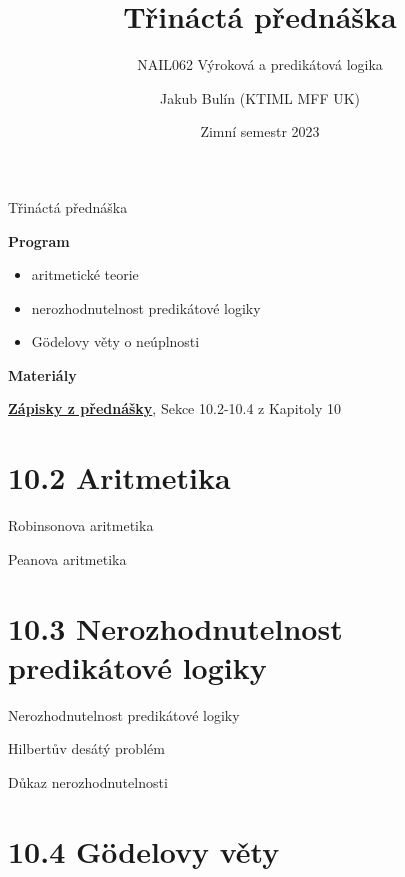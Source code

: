 \documentclass{beamer}
\title{Třináctá přednáška}
\subtitle{NAIL062 Výroková a predikátová logika}
\author{Jakub Bulín (KTIML MFF UK)}
\date{Zimní semestr 2023}
\begin{document}
\frame{\titlepage}


\begin{frame}{Třináctá přednáška}

    \textbf{Program}
        \begin{itemize}
            \item aritmetické teorie
            \item nerozhodnutelnost predikátové logiky
            \item Gödelovy věty o neúplnosti
        \end{itemize}      
    
    \textbf{Materiály}

        \href{https://github.com/jbulin-mff-uk/nail062/raw/main/lecture/lecture-notes/lecture-notes.pdf}{\alert{\textbf{Zápisky z přednášky}}}, Sekce 10.2-10.4 z Kapitoly 10

\end{frame}


\section{10.2 Aritmetika}


\begin{frame}{Robinsonova aritmetika}    


\end{frame}


\begin{frame}{Peanova aritmetika}    


\end{frame}


\section{10.3 Nerozhodnutelnost predikátové logiky}


\begin{frame}{Nerozhodnutelnost predikátové logiky}
    
\end{frame}


\begin{frame}{Hilbertův desátý problém}

\end{frame}


\begin{frame}{Důkaz nerozhodnutelnosti}

\end{frame}


\section{10.4 Gödelovy věty}
\end{document}
